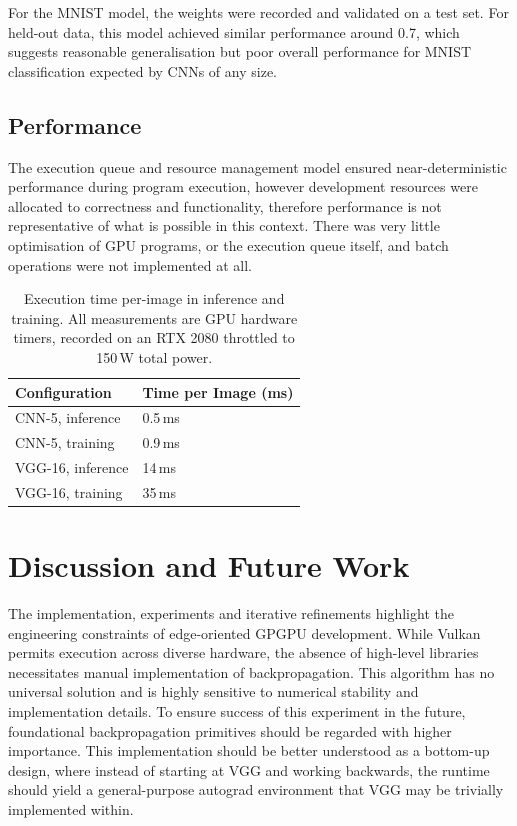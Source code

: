\documentclass[10pt, a4paper]{article}
\begin{document}
For the MNIST model, the weights were recorded and validated on a test set. For held-out data, this model achieved similar performance around 0.7, which suggests reasonable generalisation but poor overall performance for MNIST classification expected by CNNs of any size.

\subsection{Performance}
The execution queue and resource management model ensured near-deterministic performance during program execution, however development resources were allocated to correctness and functionality, therefore performance is not representative of what is possible in this context. There was very little optimisation of GPU programs, or the execution queue itself, and batch operations were not implemented at all.

\begin{table}[H]
\centering
\begin{tabular}{|l|l|}
	\hline
	\textbf{Configuration} & \textbf{Time per Image (ms)}\\
    \hline
    CNN-5, inference & 0.5\,ms\\
    CNN-5, training & 0.9\,ms\\
    VGG-16, inference & 14\,ms\\
    VGG-16, training & 35\,ms\\ 
    \hline
\end{tabular}
\caption{Execution time per-image in inference and training. All measurements are GPU hardware timers, recorded on an RTX 2080 throttled to 150\,W total power.}
\end{table}

\section{Discussion and Future Work}

The implementation, experiments and iterative refinements highlight the engineering constraints of edge-oriented GPGPU development. While Vulkan permits execution across diverse hardware, the absence of high-level libraries necessitates manual implementation of backpropagation. This algorithm has no universal solution and is highly sensitive to numerical stability and implementation details. To ensure success of this experiment in the future, foundational backpropagation primitives should be regarded with higher importance. This implementation should be better understood as a bottom-up design, where instead of starting at VGG and working backwards, the runtime should yield a general-purpose autograd environment that VGG may be trivially implemented within. 
\end{document}
